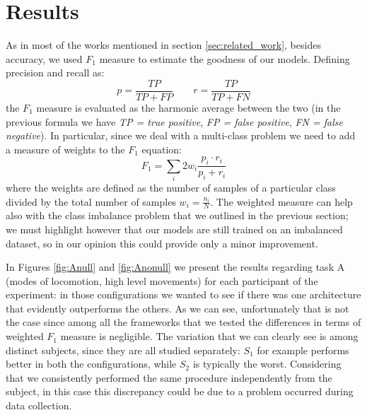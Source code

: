 
\section{Results}
\label{sec:results}

As in most of the works mentioned in section \ref{sec:related_work}, besides accuracy, we used $F_1$ measure to estimate the goodness of our models. Defining precision and recall as: 
\begin{equation}
	p = \frac{TP}{TP+FP} \qquad r = \frac{TP}{TP+FN}
\end{equation}
the $F_1$ measure is evaluated as the harmonic average between the two (in the previous formula we have \textit{TP = true positive}, \textit{FP = false positive}, \textit{FN = false negative}). In particular, since we deal with a multi-class problem we need to add a measure of weights to the $F_1$ equation:
\begin{equation}
	F_1 = \sum_i 2w_i \frac{p_i \cdot r_i}{p_i + r_i}
\end{equation} 
where the weights are defined as the number of samples of a particular class divided by the total number of samples $w_i = \frac{n_i}{N}$. The weighted measure can help also with the class imbalance problem that we outlined in the previous section; we must highlight however that our models are still trained on an imbalanced dataset, so in our opinion this could provide only a minor improvement.

In Figures \ref{fig:Anull} and \ref{fig:Anonull} we present the results regarding task A (modes of locomotion, high level movements) for each participant of the experiment: in those configurations we wanted to see if there was one architecture that evidently outperforms the others. As we can see, unfortunately that is not the case since among all the frameworks that we tested the differences in terms of weighted $F_1$ measure is negligible. The variation that we can clearly see is among distinct subjects, since they are all studied separately: $S_1$ for example performs better in both the configurations, while $S_2$ is typically the worst. Considering that we consistently performed the same procedure independently from the subject, in this case this discrepancy could be due to a problem occurred during data collection. 

